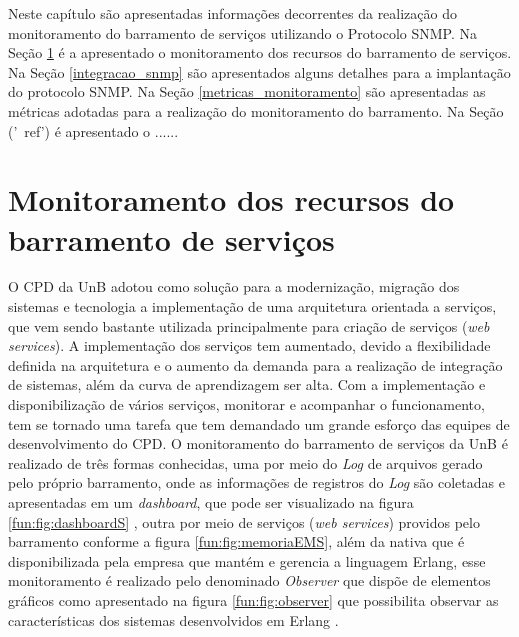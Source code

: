 \label{monitoramento_servicos}

Neste capítulo são apresentadas informações decorrentes da realização do monitoramento do barramento de serviços utilizando o Protocolo \acrshort{SNMP}. Na Seção \ref{recursos_monitoramento} é a apresentado o monitoramento dos recursos do barramento de serviços. Na Seção \ref{integracao_snmp} são apresentados alguns detalhes para a implantação do protocolo \acrshort{SNMP}. Na Seção \ref{metricas_monitoramento} são apresentadas as métricas adotadas para a realização do monitoramento do barramento. Na Seção ('\ ref') é apresentado o ......

\section{Monitoramento dos recursos do barramento de serviços}%
\label{recursos_monitoramento}

O \acrshort{CPD} da \acrshort{UnB} adotou como solução para a modernização, migração dos sistemas e tecnologia a implementação de uma arquitetura orientada a serviços, que vem sendo bastante utilizada principalmente para criação de serviços (\textit{web services}). A implementação dos serviços tem aumentado, devido a flexibilidade definida na arquitetura e o aumento da demanda para a realização de integração de sistemas, além da curva de aprendizagem ser alta. Com a implementação e disponibilização de  vários serviços, monitorar e acompanhar o funcionamento, tem se tornado uma tarefa que tem demandado um grande esforço das equipes de 
desenvolvimento do \acrshort{CPD}. O monitoramento do barramento de serviços da \acrshort{UnB} é realizado de três formas conhecidas, uma por meio do \textit{Log} de arquivos gerado pelo próprio barramento, onde as informações de registros do \textit{Log} são coletadas e apresentadas em um \textit{dashboard}, que pode ser visualizado na figura \ref{fun:fig:dashboardS} \cite{filgueirasmonitoramento}, outra por meio de serviços (\textit{web services}) providos pelo barramento conforme a figura \ref{fun:fig:memoriaEMS}, além da nativa que é disponibilizada pela empresa que mantém e gerencia a linguagem Erlang, esse monitoramento é realizado pelo denominado \textit{Observer} que dispõe de elementos gráficos como apresentado na figura \ref{fun:fig:observer} que possibilita observar as características dos sistemas desenvolvidos em Erlang \cite{ericssonAB2002-2019}. 


